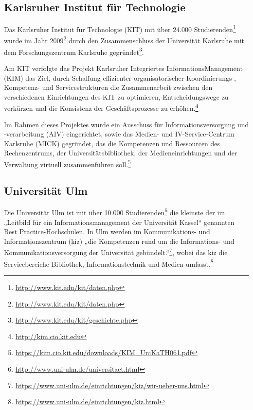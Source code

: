 \subsection{Karlsruher Institut für Technologie}
Das Karlsruher Institut für Technologie (KIT) mit über 24.000 Studierenden\footnote{\url{http://www.kit.edu/kit/daten.php}} wurde im Jahr 2009\footnote{\url{http://www.kit.edu/kit/daten.php}} durch den Zusammenschluss der Universität Karlsruhe mit dem Forschungszentrum Karlsruhe gegründet\footnote{\url{http://www.kit.edu/kit/geschichte.php}}.

Am KIT verfolgte das Projekt Karlsruher Integriertes InformationsManagement (KIM) das Ziel, durch Schaffung effizienter organisatorischer Koordinierungs-, Kompetenz- und Servicestrukturen die Zusammenarbeit zwischen den verschiedenen Einrichtungen des KIT zu optimieren, Entscheidungswege zu verkürzen und die Konsistenz der Geschäftspro\-zesse zu erhöhen.\footnote{\url{http://kim.cio.kit.edu}}

Im Rahmen dieses Projektes wurde ein Ausschuss für Informationsversorgung und \mbox{-}\nobreak ver\-arbeitung (AIV) eingerichtet, sowie das Medien- und IV-Service-Centrum Karlsruhe (MICK) gegründet, das die Kompetenzen und Ressourcen des Rechenzentrums, der Universitätsbibliothek, der Medieneinrichtungen und der Verwaltung virtuell zusammenführen soll.\footnote{\url{https://kim.cio.kit.edu/downloads/KIM_UniKaTH061.pdf}}

\subsection{Universität Ulm}
Die Universität Ulm ist mit über 10.000 Studierenden\footnote{\url{http://www.uni-ulm.de/universitaet.html}} die kleinste der im „Leitbild für ein Informationsmanagement der Universität Kassel“ genannten Best Practice-Hochschulen. In Ulm werden im Kommunikations- und Informationszentrum (kiz) „die Kompetenzen rund um die Informations- und Kommunikationsversorgung der Universität gebündelt.“\footnote{\url{https://www.uni-ulm.de/einrichtungen/kiz/wir-ueber-uns.html}}, wobei das kiz die Servicebereiche Bibliothek, Informationstechnik und Medien umfasst.\footnote{\url{https://www.uni-ulm.de/einrichtungen/kiz.html}}
